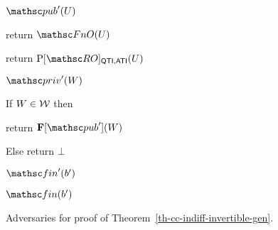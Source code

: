 \begin{figure}[t]
{\begin{algorithm-subsequent}{$\pub'(U)$}
			\item \hindent return $\FnO(U)$
			\item return $\mathrm{P}[\RO]_{\QuTInv,\AnTInv}(U)$
		\end{algorithm-subsequent}
		\ExptSepSpace
		\begin{algorithm-subsequent}{$\priv'(W)$}
			\item If $W \in {\cal W}$ then 
			\item \hindent return $\construct{F}[\pub'](W)$
			\item Else return $\bot$
		\end{algorithm-subsequent}
		\ExptSepSpace
		\begin{algorithm-subsequent}{$\Fin'(b')$}
			\item $\Finalize(b')$
		\end{algorithm-subsequent}
	}
	\caption{Adversaries for proof of Theorem~\ref{th-cc-indiff-invertible-gen}.}
	\label{fig:th-cc-indiff-invertible-gen-adversaries}
	\hrulefill
\end{figure}


